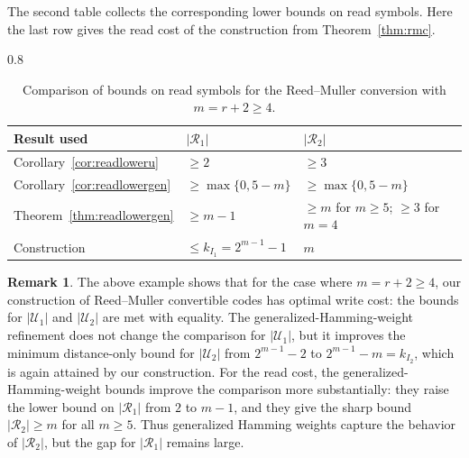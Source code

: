 \documentclass[conference, 10pt]{IEEEtran}
\theoremstyle{plain}
\theoremstyle{definition}
\newtheorem{remark}[definition]{Remark}
\newcommand{\RM}{{\text{\small $\mathbb{RM}$}}}
\newcommand{\mC}{\mathcal{C}}
\newcommand{\mU}{\mathcal{U}}
\newcommand{\mR}{\mathcal{R}}
\begin{document}
The second table collects the corresponding lower bounds on read symbols. Here the last row gives the read cost of the construction from Theorem~\ref{thm:rmc}.
\begin{table}[h!]
\centering
\caption{Comparison of bounds on read symbols for the Reed--Muller conversion with $m=r+2\ge 4$.}
\label{tab:rm-read-comparison}
\begin{scalebox}{0.8}{
\begin{tabular}{l|l|l}
\toprule
Result used & $|\mR_1|$ & $|\mR_2|$ \\
\midrule
Corollary~\ref{cor:readloweru} & $\ge 2$ & $\ge 3$ \\
Corollary~\ref{cor:readlowergen} & $\ge \max\{0,5-m\}$ & $\ge \max\{0,5-m\}$ \\
 Theorem~\ref{thm:readlowergen} & $\ge m-1$ & $\ge m$ for $m\ge 5$; $\ge 3$ for $m=4$ \\
\midrule
Construction & $\le k_{I_1}=2^{m-1}-1$ & $m$ \\
\bottomrule
\end{tabular}
}\end{scalebox}
\end{table}


\begin{remark}
The above example shows that for the case where $m = r+2 \ge 4$, our construction of Reed--Muller convertible codes has optimal write cost: the bounds for $|\mU_1|$ and $|\mU_2|$ are met with equality. The generalized-Hamming-weight refinement does not change the comparison for $|\mU_1|$, but it improves the minimum distance-only bound for $|\mU_2|$ from $2^{m-1}-2$ to $2^{m-1}-m=k_{I_2}$, which is again attained by our construction. For the read cost, the generalized-Hamming-weight bounds improve the comparison more substantially: they raise the lower bound on $|\mR_1|$ from $2$ to $m-1$, and they give the sharp bound $|\mR_2|\ge m$ for all $m\ge 5$. Thus generalized Hamming weights capture the behavior of $|\mR_2|$, but the gap for $|\mR_1|$ remains large.

\end{remark}
\end{document}

